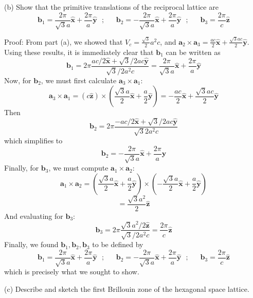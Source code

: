 \documentclass{article}
\begin{document}
(b) Show that the primitive translations of the reciprocal lattice are
\[\textbf{b}_1 = \frac{2\pi}{\sqrt{3}a}\hat{\textbf{x}} + \frac{2\pi}{a}\hat{\textbf{y}} \:\:\: ; \:\:\:\:\:\:\: \textbf{b}_2 = -\frac{2\pi}{\sqrt{3}a} \hat{\textbf{x}} + \frac{2\pi}{a} \hat{\textbf{y}} \:\:\: ; \:\:\:\:\:\:\: \textbf{b}_3 = \frac{2\pi}{c} \hat{\textbf{z}}\]

Proof: From part (a), we showed that $V_c = \frac{\sqrt{3}}{2}a^2c$, and $\textbf{a}_2 \times \textbf{a}_3 = \frac{ac}{2}\hat{\textbf{x}} + \frac{\sqrt{3}ac}{2}\hat{\textbf{y}}$. Using these results, it is immediately clear that $\textbf{b}_1$ can be written as
\[\textbf{b}_1 = 2\pi \frac{ac/2 \hat{\textbf{x}} + \sqrt{3}/2ac\hat{\textbf{y}}}{\sqrt{3}/2a^2c} = \frac{2\pi}{\sqrt{3}a}\hat{\textbf{x}} + \frac{2\pi}{a}\hat{\textbf{y}}\]
Now, for $\textbf{b}_2$, we must first calculate $\textbf{a}_3 \times \textbf{a}_1$:
\[\textbf{a}_3 \times \textbf{a}_1 = (c\hat{\textbf{z}}) \times \left( \frac{\sqrt{3}a}{2} \hat{\textbf{x}} + \frac{a}{2}\hat{\textbf{y}} \right) = -\frac{ac}{2}\hat{\textbf{x}} + \frac{\sqrt{3}ac}{2}\hat{\textbf{y}}\]
Then 
\[\textbf{b}_2 = 2\pi \frac{-ac/2 \hat{\textbf{x}} + \sqrt{3}/2ac\hat{\textbf{y}}}{\sqrt{3}{2}a^2c}\]
which simplifies to
\[\textbf{b}_2 = -\frac{2\pi}{\sqrt{3}a}\hat{\textbf{x}} + \frac{2\pi}{a}\hat{\textbf{y}}\]
Finally, for $\textbf{b}_3$, we must compute $\textbf{a}_1 \times \textbf{a}_2$:
\[\textbf{a}_1 \times \textbf{a}_2 = \left( \frac{\sqrt{3}a}{2}\hat{\textbf{x}} + \frac{a}{2} \hat{\textbf{y}} \right) \times \left( -\frac{\sqrt{3}a}{2}\hat{\textbf{x}} + \frac{a}{2}\hat{\textbf{y}} \right)\]
\[ = \frac{\sqrt{3}a^2}{2} \hat{\textbf{z}}\]
And evaluating for $\textbf{b}_3$:
\[\textbf{b}_3 = 2\pi \frac{\sqrt{3}a^2/2 \hat{\textbf{z}}}{\sqrt{3}/2a^2c} = \frac{2\pi}{c}\hat{\textbf{z}}\]
Finally, we found $\textbf{b}_1, \textbf{b}_2, \textbf{b}_3$ to be defined by
\[\textbf{b}_1 = \frac{2\pi}{\sqrt{3}a}\hat{\textbf{x}} + \frac{2\pi}{a}\hat{\textbf{y}} \:\:\: ; \:\:\:\:\:\:\: \textbf{b}_2 = -\frac{2\pi}{\sqrt{3}a}\hat{\textbf{x}} + \frac{2\pi}{a}\hat{\textbf{y}} \:\:\: ; \:\:\:\:\:\:\: \textbf{b}_3 = \frac{2\pi}{c}\hat{\textbf{z}}\]
which is precisely what we sought to show.
\newline

(c) Describe and sketch the first Brillouin zone of the hexagonal space lattice.
\newline
\end{document}
